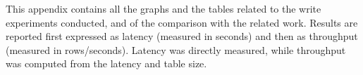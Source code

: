 This appendix contains all the graphs and the tables related to the write experiments conducted, and of the comparison with the related work. Results are reported first expressed as latency (measured in seconds) and then as throughput (measured in rows/seconds). Latency was directly measured, while throughput was computed from the latency and table size.